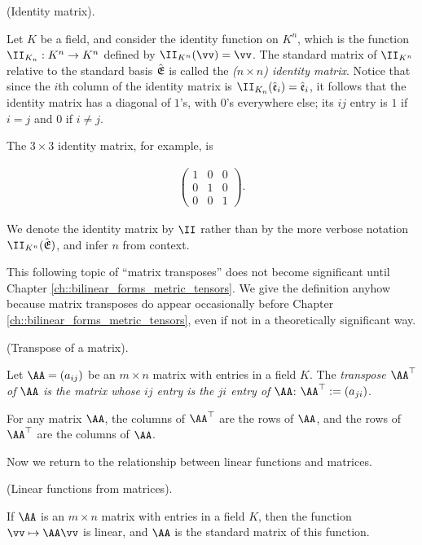 \begin{defn}
    (Identity matrix).
    
    Let $K$ be a field, and consider the identity function on $K^n$, which is the function $\II_{K_n}:K^n \rightarrow K^n$ defined by $\II_{K^n}(\vv) = \vv$. The standard matrix of $\II_{K^n}$ relative to the standard basis ${\hat{\mathfrak{E}}}$ is called the \textit{($n \times n$) identity matrix}. Notice that since the $i$th column of the identity matrix is $\II_{K_n}(\see_i) = \see_i$, it follows that the identity matrix has a diagonal of $1$'s, with $0$'s everywhere else; its $ij$ entry is $1$ if $i = j$ and $0$ if $i \neq j$. 
    
    The $3 \times 3$ identity matrix, for example, is
    
    \begin{align*}
        \begin{pmatrix}
            1 & 0 & 0 \\
            0 & 1 & 0 \\
            0 & 0 & 1
        \end{pmatrix}.
    \end{align*}
    
    We denote the identity matrix by $\II$ rather than by the more verbose notation $\II_{K^n}(\sE)$, and infer $n$ from context.
\end{defn}

This following topic of ``matrix transposes'' does not become significant until Chapter \ref{ch::bilinear_forms_metric_tensors}. We give the definition anyhow because matrix transposes do appear occasionally before Chapter \ref{ch::bilinear_forms_metric_tensors}, even if not in a theoretically significant way.

\begin{defn}
    (Transpose of a matrix).

    Let $\AA = (a_{ij})$ be an $m \times n$ matrix with entries in a field $K$. The \textit{transpose $\AA^\top$ of $\AA$ is the matrix whose $ij$ entry is the $ji$ entry of $\AA$}: $\AA^\top := (a_{ji})$. 
    
    For any matrix $\AA$, the columns of $\AA^\top$ are the rows of $\AA$, and the rows of $\AA^\top$ are the columns of $\AA$.
\end{defn}

Now we return to the relationship between linear functions and matrices.

\begin{theorem}
    (Linear functions from matrices).
    
    If $\AA$ is an $m \times n$ matrix with entries in a field $K$, then the function $\vv \mapsto \AA \vv$ is linear, and $\AA$ is the standard matrix of this function.
\end{theorem}

